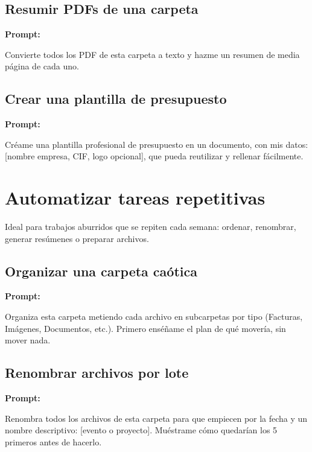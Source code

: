 \documentclass[11pt,a4paper]{report}
\begin{document}
\subsection{Resumir PDFs de una carpeta}

\noindent\textbf{Prompt: }
\begin{codebox}
Convierte todos los PDF de esta carpeta a texto y hazme un resumen de media página de cada uno.
\end{codebox}

\subsection{Crear una plantilla de presupuesto}

\noindent\textbf{Prompt: }
\begin{codebox}
Créame una plantilla profesional de presupuesto en un documento, con mis datos: [nombre empresa, CIF, logo opcional], que pueda reutilizar y rellenar fácilmente.
\end{codebox}

\section{ Automatizar tareas repetitivas}

Ideal para trabajos aburridos que se repiten cada semana: ordenar, renombrar, generar resúmenes o preparar archivos.

\subsection{Organizar una carpeta caótica}

\noindent\textbf{Prompt: }
\begin{codebox}
Organiza esta carpeta metiendo cada archivo en subcarpetas por tipo (Facturas, Imágenes, Documentos, etc.). Primero enséñame el plan de qué movería, sin mover nada.
\end{codebox}

\subsection{Renombrar archivos por lote}

\noindent\textbf{Prompt: }
\begin{codebox}
Renombra todos los archivos de esta carpeta para que empiecen por la fecha y un nombre descriptivo: [evento o proyecto]. Muéstrame cómo quedarían los 5 primeros antes de hacerlo.
\end{codebox}
\end{document}
